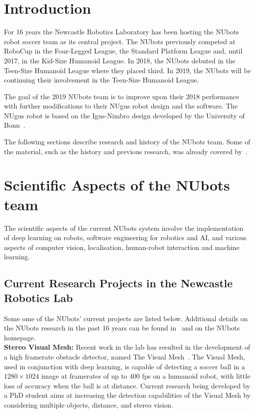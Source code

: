 \documentclass{llncs}
\begin{document}
%
\section{Introduction}
For 16 years the Newcastle Robotics Laboratory has been hosting the NUbots robot soccer team as its central project. The NUbots previously competed at RoboCup in the Four-Legged League, the Standard Platform League and, until 2017, in the Kid-Size Humanoid League. In 2018, the NUbots debuted in the Teen-Size Humanoid League where they placed third. In 2019, the NUbots will be continuing their involvement in the Teen-Size Humanoid League.

The goal of the 2019 NUbots team is to improve upon their 2018 performance with further modifications to their NUgus robot design and the software. The NUgus robot is based on the Igus-Nimbro design developed by the University of Bonn~\cite{allgeuer2016igus}.

The following sections describe research and history of the NUbots team. Some of the material, such as the history and previous research, was already covered by~\cite{AmosEtAl2018}.


\section{Scientific Aspects of the NUbots team}

The scientific aspects of the current NUbots system involve the implementation of deep learning on robots, software engineering for robotics and AI, and various aspects of computer vision, localisation, human-robot interaction and machine learning.

\subsection{Current Research Projects in the Newcastle Robotics Lab}
Some ome of the NUbots' current projects are listed below. Additional details on the NUbots research in the past 16 years can be found in~\cite{AmosEtAl2018} and on the NUbots homepage.\\

\noindent\textbf{Stereo Visual Mesh:}
Recent work in the lab has resulted in the development of a high framerate obstacle detector, named The Visual Mesh~\cite{Houliston2018VisualMR}. The Visual Mesh, used in conjunction with deep learning, is capable of detecting a soccer ball in a $1280\times 1024$ image at framerates of up to $400$ fps on a humanoid robot, with little loss of accuracy when the ball is at distance. Current research being developed by a PhD student aims at increasing the detection capabilities of the Visual Mesh by considering multiple objects, distance, and stereo vision.\\
\end{document}

